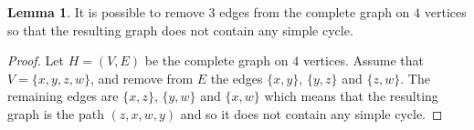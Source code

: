 \documentclass{article}
\theoremstyle{definition}
\newtheorem{lemma}{Lemma}[section]
\begin{document}



\begin{lemma} It is possible to remove $3$ edges from the complete graph on $4$ vertices so that the resulting graph does not contain any simple cycle. \label{lem:removingEdges}\end{lemma}

\begin{proof} Let $H = (V,E)$ be the complete graph on $4$ vertices. Assume that $V = \{x,y,z,w\}$, and remove from $E$ the edges $\{x,y\}$, $\{y,z\}$ and $\{z,w\}$. The remaining edges are $\{x,z\}$, $\{y,w\}$ and $\{x,w\}$ which means that the resulting graph is the path $(z,x,w,y)$ and so it does not contain any simple cycle. \end{proof}
\end{document}
